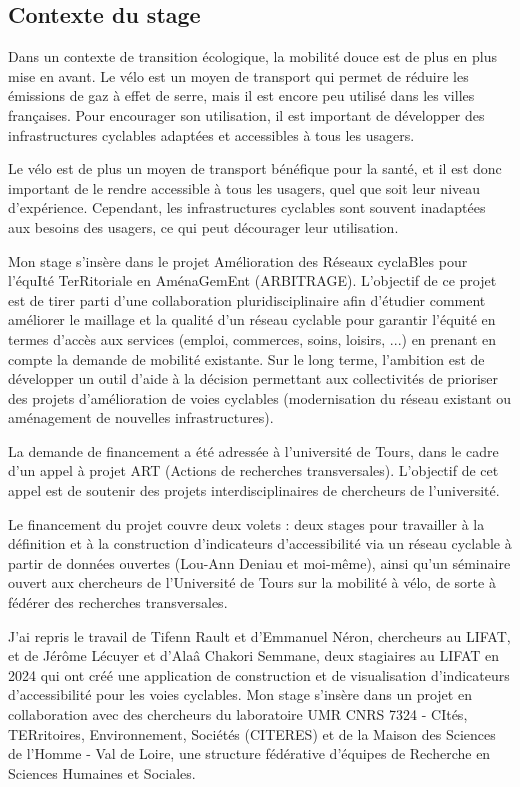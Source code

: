 \subsection{Contexte du stage}

Dans un contexte de transition écologique, la mobilité douce est de plus en plus mise en avant. Le vélo est un moyen de transport qui permet de réduire les émissions de gaz à effet de serre, mais il est encore peu utilisé dans les villes françaises. Pour encourager son utilisation, il est important de développer des infrastructures cyclables adaptées et accessibles à tous les usagers.

Le vélo est de plus un moyen de transport bénéfique pour la santé, et il est donc important de le rendre accessible à tous les usagers, quel que soit leur niveau d'expérience. Cependant, les infrastructures cyclables sont souvent inadaptées aux besoins des usagers, ce qui peut décourager leur utilisation.


Mon stage s'insère dans le projet Amélioration des Réseaux cyclaBles pour l'équIté TerRitoriale en AménaGemEnt (ARBITRAGE). L'objectif de ce projet est de tirer parti d'une collaboration pluridisciplinaire afin d'étudier comment améliorer le maillage et la qualité d'un réseau cyclable pour garantir l'équité en termes d'accès aux services (emploi, commerces, soins, loisirs, ...) en prenant en compte la demande de mobilité existante. Sur le long terme, l'ambition est de développer un outil d'aide à la décision permettant aux collectivités de prioriser des projets d'amélioration de voies cyclables (modernisation du réseau existant ou aménagement de nouvelles infrastructures). 

La demande de financement a été adressée à l'université de Tours, dans le cadre d'un appel à projet ART (Actions de recherches transversales). L'objectif de cet appel est de soutenir des projets interdisciplinaires de chercheurs de l'université.

Le financement du projet couvre deux volets : deux stages pour travailler à la définition et à la construction d'indicateurs d'accessibilité via un réseau cyclable à partir de données ouvertes (Lou-Ann Deniau et moi-même), ainsi qu'un séminaire ouvert aux chercheurs de l'Université de Tours sur la mobilité à vélo, de sorte à fédérer des recherches transversales.

J'ai repris le travail de Tifenn Rault et d'Emmanuel Néron, chercheurs au LIFAT, et de Jérôme Lécuyer et d'Alaâ Chakori Semmane, deux stagiaires au LIFAT en 2024 qui ont créé une application de construction et de visualisation d'indicateurs d'accessibilité pour les voies cyclables. Mon stage s'insère dans un projet en collaboration avec des chercheurs du laboratoire UMR CNRS 7324 - CItés, TERritoires, Environnement, Sociétés (CITERES) et de la Maison des Sciences de l'Homme - Val de Loire, une structure fédérative d'équipes de Recherche en Sciences Humaines et Sociales. 


